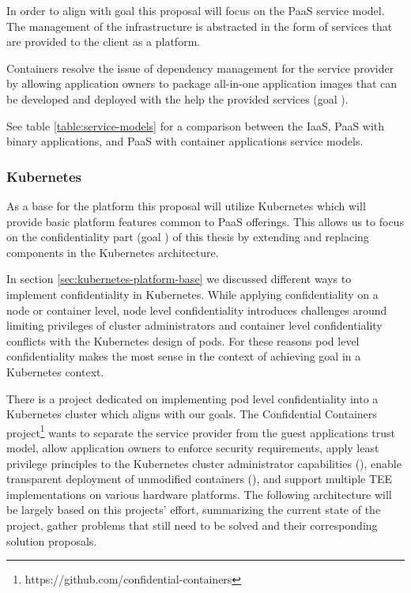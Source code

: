 In order to align with goal  this proposal will focus on the
PaaS service model. The management of the infrastructure is abstracted in the
form of services that are provided to the client as a platform.

Containers resolve the issue of dependency management for the service provider
by allowing application owners to package all-in-one application images that can
be developed and deployed with the help the provided services (goal
).

See table \ref{table:service-models} for a comparison between the IaaS, PaaS
with binary applications, and PaaS with container applications service models.

\subsubsection*{Kubernetes}

As a base for the platform this proposal will utilize Kubernetes which will
provide basic platform features common to PaaS offerings. This allows us to
focus on the confidentiality part (goal ) of this thesis by extending
and replacing components in the Kubernetes architecture.

In section \ref{sec:kubernetes-platform-base} we discussed different ways to
implement confidentiality in Kubernetes. While applying confidentiality on a
node or container level, node level confidentiality introduces challenges around
limiting privileges of cluster administrators and container level
confidentiality conflicts with the Kubernetes design of pods. For these reasons
pod level confidentiality makes the most sense in the context of achieving goal
 in a Kubernetes context.

There is a project dedicated on implementing pod level confidentiality into a
Kubernetes cluster which aligns with our goals. The Confidential Containers
project\footnote{https://github.com/confidential-containers} wants to separate
the service provider from the guest applications trust model, allow application
owners to enforce security requirements, apply least privilege principles to the
Kubernetes cluster administrator capabilities (), enable
transparent deployment of unmodified containers (), and support
multiple TEE implementations on various hardware platforms. The following
architecture will be largely based on this projects' effort, summarizing the
current state of the project, gather problems that still need to be solved and
their corresponding solution proposals.

